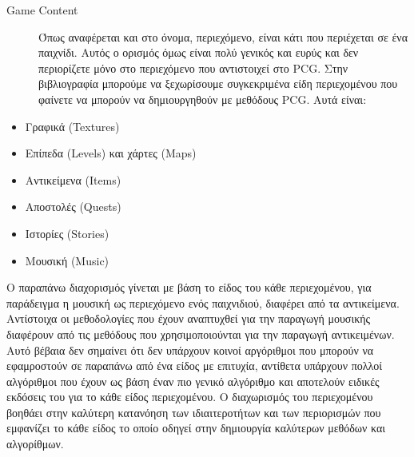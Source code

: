 \begin{description}
\item [Game Content] Όπως αναφέρεται και στο όνομα, περιεχόμενο, είναι κάτι που περιέχεται σε ένα παιχνίδι. Αυτός ο ορισμός όμως είναι πολύ γενικός και ευρύς και δεν περιορίζετε μόνο στο περιεχόμενο που αντιστοιχεί στο PCG. Στην βιβλιογραφία μπορούμε να ξεχωρίσουμε συγκεκριμένα είδη περιεχομένου που φαίνετε να μπορούν να δημιουργηθούν με μεθόδους PCG. Αυτά είναι:
\end{description}

\begin{itemize}
  \item Γραφικά (Textures)
  \item Επίπεδα (Levels) και χάρτες (Maps)
   \item Αντικείμενα (Items)
   \item Αποστολές (Quests)
   \item Ιστορίες (Stories)
   \item Μουσική (Music)
\end{itemize}

Ο παραπάνω διαχορισμός γίνεται με βάση το είδος του κάθε περιεχομένου, για παράδειγμα η μουσική ως περιεχόμενο ενός παιχνιδιού, διαφέρει από τα αντικείμενα. Αντίστοιχα οι μεθοδολογίες που έχουν αναπτυχθεί για την παραγωγή μουσικής διαφέρουν από τις μεθόδους που χρησιμοποιούνται για την παραγωγή αντικειμένων. Αυτό βέβαια δεν σημαίνει ότι δεν υπάρχουν κοινοί αργόριθμοι που μπορούν να εφαμροστούν σε παραπάνω από ένα είδος με επιτυχία, αντίθετα υπάρχουν πολλοί αλγόριθμοι που έχουν ως βάση έναν πιο γενικό αλγόριθμο και αποτελούν ειδικές εκδόσεις του για το κάθε είδος περιεχομένου. Ο διαχωρισμός του περιεχομένου βοηθάει στην καλύτερη κατανόηση των ιδιαιτεροτήτων και των περιορισμών που εμφανίζει το κάθε είδος το οποίο οδηγεί στην δημιουργία καλύτερων μεθόδων και αλγορίθμων.

